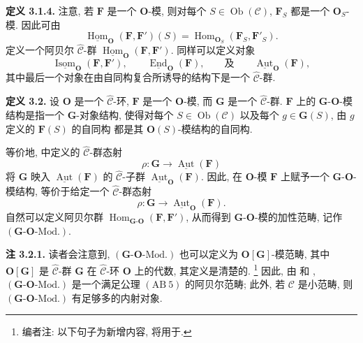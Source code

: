 \medskip
\noindent{}\textbf{定义 3.1.4.}
注意, 若 \(\mathbf F\) 是一个 \(\mathbf O\)-模, 则对每个
\(S\in\operatorname{Ob}(\mathscr C)\), \(\mathbf F_S\) 都是一个
\(\mathbf O_S\)-模. 因此可由
\[
  \underline{\operatorname{Hom}}_{\mathbf O}(\mathbf F,\mathbf F')(S)
    =\operatorname{Hom}_{\mathbf O_S}(\mathbf F_S,\mathbf F'_S).
\]
定义一个阿贝尔 \(\widehat{\mathscr C}\)-群
\(\underline{\operatorname{Hom}}_{\mathbf O}(\mathbf F,\mathbf F')\).
同样可以定义对象
\[
  \underline{\operatorname{Isom}}_{\mathbf O}(\mathbf F,\mathbf F'),
  \qquad
  \underline{\operatorname{End}}_{\mathbf O}(\mathbf F),
  \qquad\text{及}\qquad
  \underline{\operatorname{Aut}}_{\mathbf O}(\mathbf F),
\]
其中最后一个对象在由自同构复合所诱导的结构下是一个
\(\widehat{\mathscr C}\)-群.

\medskip
\noindent{}\textbf{定义 3.2.}
设 \(\mathbf O\) 是一个 \(\widehat{\mathscr C}\)-环,
\(\mathbf F\) 是一个 \(\mathbf O\)-模, 而 \(\mathbf G\) 是一个
\(\widehat{\mathscr C}\)-群.
\(\mathbf F\) 上的 \(\mathbf G\)-\(\mathbf O\)-模结构是指一个
\(\mathbf G\)-对象结构, 使得对每个
\(S\in\operatorname{Ob}(\mathscr C)\) 以及每个
\(g\in\mathbf G(S)\), 由 \(g\) 定义的 \(\mathbf F(S)\) 的自同构
都是其 \(\mathbf O(S)\)-模结构的自同构.

等价地,  中定义的
\(\widehat{\mathscr C}\)-群态射
\[
  \rho:\mathbf G\longrightarrow
    \underline{\operatorname{Aut}}(\mathbf F)
\]
将 \(\mathbf G\) 映入 \(\underline{\operatorname{Aut}}(\mathbf F)\)
的 \(\widehat{\mathscr C}\)-子群
\(\underline{\operatorname{Aut}}_{\mathbf O}(\mathbf F)\).
因此, 在 \(\mathbf O\)-模 \(\mathbf F\) 上赋予一个
\(\mathbf G\)-\(\mathbf O\)-模结构, 等价于给定一个
\(\widehat{\mathscr C}\)-群态射
\[
  \rho:\mathbf G\longrightarrow
    \underline{\operatorname{Aut}}_{\mathbf O}(\mathbf F).
\]
自然可以定义阿贝尔群
\(\operatorname{Hom}_{\mathbf G\text{-}\mathbf O}
  (\mathbf F,\mathbf F')\), 从而得到
\(\mathbf G\)-\(\mathbf O\)-模的加性范畴, 记作
\((\mathbf G\text{-}\mathbf O\text{-Mod.})\).

\medskip
\noindent{}\textbf{注 3.2.1.}
读者会注意到, \((\mathbf G\text{-}\mathbf O\text{-Mod.})\)
也可以定义为 \(\mathbf O[\mathbf G]\)-模范畴, 其中
\(\mathbf O[\mathbf G]\) 是 \(\widehat{\mathscr C}\)-群 \(\mathbf G\)
在 \(\widehat{\mathscr C}\)-环 \(\mathbf O\) 上的代数,
其定义是清楚的.
\footnote{编者注: 以下句子为新增内容, 将用于.}
因此, 由  和
,
\((\mathbf G\text{-}\mathbf O\text{-Mod.})\) 是一个满足公理
\(\mathrm{(AB\ 5)}\) 的阿贝尔范畴; 此外, 若 \(\mathscr C\)
是小范畴, 则 \((\mathbf G\text{-}\mathbf O\text{-Mod.})\)
有足够多的内射对象.

